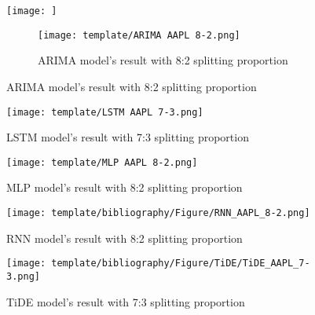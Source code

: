 \documentclass{ieeeojies}
\begin{document}
\begin{figure}[H]
  \centering
  \begin{minipage}{0.8\linewidth}
    \centering
    \texttt{[image: ]}
\begin{figure}
        \centering
        \texttt{[image: template/ARIMA AAPL 8-2.png]}
        \caption{ARIMA model's result with 8:2 splitting proportion}
        \label{fig:enter-label}
    \end{figure}
    \label{fig11}
  \end{minipage}
\end{figure}
\begin{figure}[H]
  \centering
  \begin{minipage}{0.8\linewidth}
    \centering
    \texttt{[image: template/LSTM AAPL 7-3.png]}
    \caption{LSTM model's result with 7:3 splitting proportion}
    \label{fig12}
  \end{minipage}
\end{figure}
\begin{figure}[H]
  \centering
  \begin{minipage}{0.8\linewidth}
    \centering
    \texttt{[image: template/MLP AAPL 8-2.png]}
    \caption{MLP model's result with 8:2 splitting proportion}
    \label{fig13}
  \end{minipage}
\end{figure}
\begin{figure}[H]
  \centering
  \begin{minipage}{0.8\linewidth}
    \centering
    \texttt{[image: template/bibliography/Figure/RNN\_AAPL\_8-2.png]}
    \caption{RNN model's result with 8:2 splitting proportion}
    \label{fig14}
  \end{minipage}
\end{figure}
\begin{figure}[H]
  \centering
  \begin{minipage}{0.8\linewidth}
    \centering
    \texttt{[image: template/bibliography/Figure/TiDE/TiDE\_AAPL\_7-3.png]}
    \caption{TiDE model's result with 7:3 splitting proportion}
    \label{bagginggru}
  \end{minipage}
\end{figure}
\end{document}

